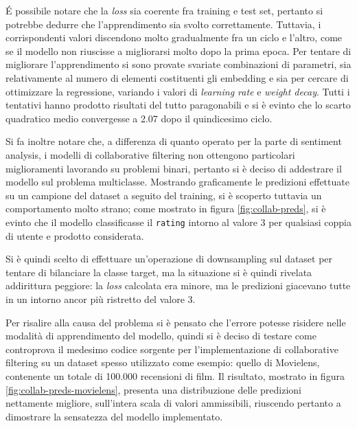 \documentclass[hidelinks, 12pt]{article}
\begin{document}
É possibile notare che la \textit{loss} sia coerente fra training e test set, pertanto si potrebbe dedurre che l'apprendimento sia svolto correttamente. Tuttavia, i corrispondenti valori discendono molto gradualmente fra un ciclo e l'altro, come se il modello non riuscisse a migliorarsi molto dopo la prima epoca. Per tentare di migliorare l'apprendimento si sono provate svariate combinazioni di parametri, sia relativamente al numero di elementi costituenti gli embedding e sia per cercare di ottimizzare la regressione, variando i valori di \textit{learning rate} e \textit{weight decay}. Tutti i tentativi hanno prodotto risultati del tutto paragonabili e si è evinto che lo scarto quadratico medio convergesse a 2.07 dopo il quindicesimo ciclo.

Si fa inoltre notare che, a differenza di quanto operato per la parte di sentiment analysis, i modelli di collaborative filtering non ottengono particolari miglioramenti lavorando su problemi binari, pertanto si è deciso di addestrare il modello sul problema multiclasse. Mostrando graficamente le predizioni effettuate su un campione del dataset a seguito del training, si è scoperto tuttavia un comportamento molto strano; come mostrato in figura \ref{fig:collab-preds}, si è evinto che il modello classificasse il \texttt{rating} intorno al valore 3 per qualsiasi coppia di utente e prodotto considerata.

Si è quindi scelto di effettuare un'operazione di downsampling sul dataset per tentare di bilanciare la classe target, ma la situazione si è quindi rivelata addirittura peggiore: la \textit{loss} calcolata era minore, ma le predizioni giacevano tutte in un intorno ancor più ristretto del valore 3.

Per risalire alla causa del problema si è pensato che l'errore potesse risidere nelle modalità di apprendimento del modello, quindi si è deciso di testare come controprova il medesimo codice sorgente per l'implementazione di collaborative filtering su un dataset spesso utilizzato come esempio: quello di Movielens, contenente un totale di 100.000 recensioni di film. Il risultato, mostrato in figura \ref{fig:collab-preds-movielens}, presenta una distribuzione delle predizioni nettamente migliore, sull'intera scala di valori ammissibili, riuscendo pertanto a dimostrare la sensatezza del modello implementato.
\end{document}
